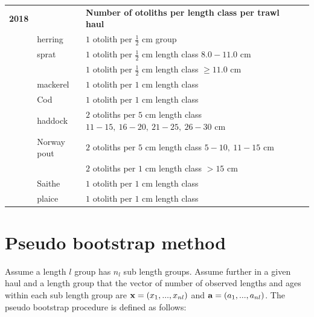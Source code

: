 \documentclass[a4paper 12pt]{article}
\numberwithin{equation}{section}
\begin{document}
\begin{small}
\begin{table}[h!]
\begin{tabularx}{\linewidth}{r l l l l X}
{\bf 2018} & & {\bf Number of otoliths per length class per trawl haul}  \\[1.0ex]
  & herring  &  $1$  otolith per $\frac{1}{2}$ cm group \\[0.5ex]
     & sprat    & $1$  otolith per $\frac{1}{2}$ cm length class  $8.0 -11.0$ cm\\[0.5ex]
              & & $1$  otolith per $\frac{1}{2}$ cm length class  $\geq 11.0$ cm\\[0.5ex]
& mackerel      & $1$  otolith per $1$ cm length class \\[0.5ex]
& Cod       	  & $1$  otolith per $1$ cm length class\\[0.5ex]
& haddock & $2$  otoliths per $5$ cm length class $11 -15, \ 16-20, \ 21-25, \ 26-30$ cm \\[0.5ex]
& Norway pout & $2$  otoliths per $5$ cm length class $5 -10, \ 11-15$ cm\\[0.5ex]
               & & $2$  otoliths per $1$ cm length class $> 15$ cm\\[1.0ex]
&Saithe        & $1$  otolith per $1$ cm length class \\[0.5ex]  
&plaice       & $1$  otolith per $1$ cm length class \\[0.1ex]
\bottomrule         
\end{tabularx}
\end{table}
\end{small}


\section{Pseudo bootstrap method}
\label{secAp:pseudobootstrap}
Assume a length $l$ group has $n_{l}$ sub length groups. Assume further in a given haul and a length group that the vector of number of observed lengths and ages within each sub length group are ${\bf x} = \left(x_{1},...,x_{nl}\right)$ and ${\bf a} = \left(a_{1},...,a_{nl}\right)$.  The pseudo bootstrap procedure is defined as follows:
\end{document}
